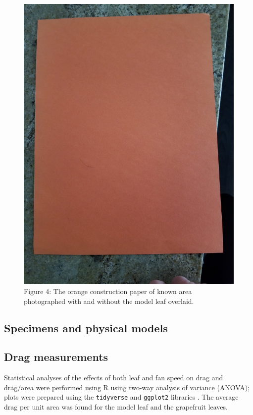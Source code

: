 \documentclass{article}
\begin{document}
\begin{figure}
    \includegraphics{Paper.jpg}
    \caption{Figure 4: The orange construction paper of known area photographed with and without the model leaf overlaid.}
\end{figure}

\subsection{Specimens and physical models}
\subsection{Drag measurements}

Statistical analyses of the effects of both leaf and fan speed on drag and drag/area were performed using R \citep{r2020} using two-way analysis of variance (ANOVA); plots were prepared using the \lstinline{tidyverse} and \lstinline{ggplot2} libraries \citep{wickham2019tidyverse}. The average drag per unit area was found for the model leaf and the grapefruit leaves.
\end{document}
